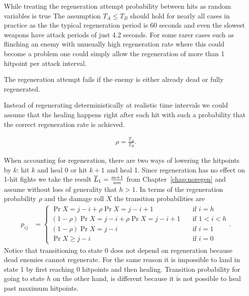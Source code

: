 While treating the regeneration attempt probability between hits as random variables is true
The assumption $T_A \leq T_B$ should hold for nearly all cases in practice as the the typical regeneration period is 60 seconds and even the slowest weapons have attack periods of just 4.2 seconds. For some rarer cases such as flinching an enemy with unusually high regeneration rate where this could become a problem one could simply allow the regeneration of more than 1 hitpoint per attack interval.



The regeneration attempt fails if the enemy is either already dead or fully regenerated.

Instead of regenerating deterministically at realistic time intervals we could assume that the healing happens right after each hit with such a probability that the correct regeneration rate is achieved.

\begin{align}\label{eq:regenProbability}
    \rho = \frac{T_A}{T_R}.
\end{align}

When accounting for regeneration, there are two ways of lowering the hitpoints by $k$: hit $k$ and heal 0 or hit $k+1$ and heal 1. Since regeneration has no effect on 1-hit fights we take the result $\overline{L}_1 = \frac{m+1}{am}$ from Chapter~\ref{chap:noregen} and assume without loss of generality that $h>1$. In terms of the regeneration probability $\rho$ and the damage roll $X$ the transition probabilities are
\begin{align}
    p_{ij}
         &= \begin{cases}
			 \Pr{X = j-i} + \rho \Pr{X = j-i+1} \quad &\mbox{if } i = h \\
            (1-\rho)\Pr{X = j-i} + \rho \Pr{X = j-i+1} \quad &\mbox{if } 1 < i < h \\
            (1-\rho)\Pr{X = j-i} \quad &\mbox{if } i = 1 \\
            \Pr{X \geq j-i} \quad &\mbox{if } i = 0
        \end{cases}\label{eq:damageDistributionRegen}.
\end{align}
Notice that transitioning to state 0 does not depend on regeneration because dead enemies cannot regenerate. For the same reason it is impossible to land in state 1 by first reaching 0 hitpoints and then healing. Transition probability for going to state $h$ on the other hand, is different because it is not possible to heal past maximum hitpoints.

